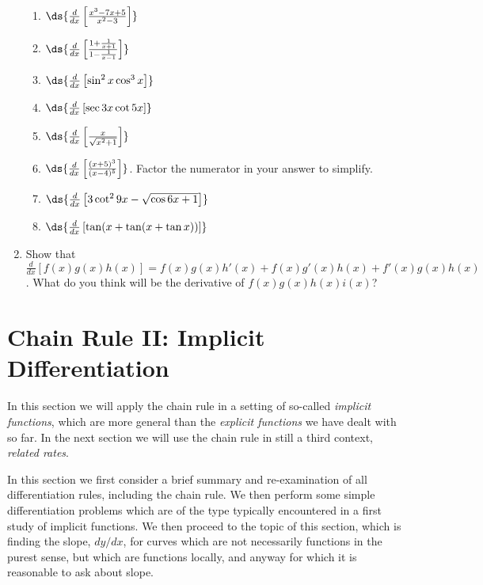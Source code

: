 \begin{multicols}{2}
\begin{enumerate}
\begin{enumerate}
  \item $\ds{\frac{d}{dx}\left[\frac{x^3-7x+5}{x^2-3}\right]}$
  \item $\ds{\frac{d}{dx}\left[\frac{1+\frac1{x+1}}{1-\frac1{x-1}}\right]}$
  \item $\ds{\frac{d}{dx}\left[\sin^2x\cos^3x\right]}$
  \item $\ds{\frac{d}{dx}\left[\sec3x\cot5x\right]}$
  \item $\ds{\frac{d}{dx}\left[\frac{x}{\sqrt{x^2+1}}\right]}$
  \item $\ds{\frac{d}{dx}\left[\frac{(x+5)^3}{(x-4)^5}\right]}$.  
        Factor the numerator in your answer
        to simplify.
  \item $\ds{\frac{d}{dx}\left[3\cot^29x-\sqrt{\cos6x+1}\right]}$
  \item $\ds{\frac{d}{dx}\left[\tan(x+\tan(x+\tan x))\right]}$


  \end{enumerate}






\item Show that $\frac{d}{dx}[f(x)g(x)h(x)]
=f(x)g(x)h'(x)+f(x)g'(x)h(x)+f'(x)g(x)h(x)$.
What do you think will be the derivative
of $f(x)g(x)h(x)i(x)$?
\end{enumerate}
\end{multicols}




\newpage
\section{Chain Rule II: Implicit Differentiation
\label{ImplicitDifferentiationSection}}
In this section we will apply the chain rule in a
setting of so-called {\it implicit functions},
which are more general than the {\it explicit functions}
we have dealt with so far.  In the next section we
will use the chain rule in still a third context,
{\it related rates}.  

In this section we first consider a brief summary and re-examination of 
all differentiation rules, including the chain rule.
We then perform some simple differentiation problems
which are of the type typically encountered in a first study
of implicit functions.  We then proceed to the topic of this section,
which is finding the slope, $dy/dx$, for curves which are not
necessarily functions in the purest sense, but which are functions
locally, and anyway for which it is reasonable to ask about
slope.

